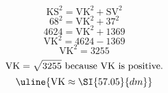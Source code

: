 \[\text{KS}^{2}=\text{VK}^{2}+\text{SV}^{2}\]
\[68^{2}=\text{VK}^{2}+37^{2}\]
\[4624=\text{VK}^{2}+1369\]
\[\text{VK}^{2}=4624-1369\]
\[\text{VK}^{2}=3255\]
\[\text{VK}=\sqrt{\mathstrut 3255}\text{ because VK is positive.}\]
\[\uline{\text{VK}\approx\SI{57.05}{dm}}\]